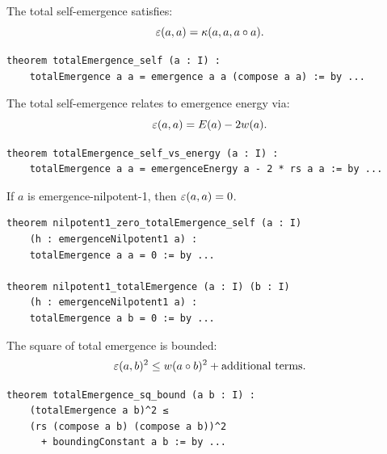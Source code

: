 \begin{theorem}
\label{thm:total-emergence-self}
The total self-emergence satisfies:
\[
  \varepsilon(a,a) = \kappa(a, a, a \circ a).
\]
\end{theorem}

\begin{lstlisting}[caption={Total emergence self (IDT\_v3\_Emergence.lean)}]
theorem totalEmergence_self (a : I) :
    totalEmergence a a = emergence a a (compose a a) := by ...
\end{lstlisting}

\begin{theorem}
\label{thm:total-emergence-self-vs-energy}
The total self-emergence relates to emergence energy via:
\[
  \varepsilon(a,a) = E(a) - 2w(a).
\]
\end{theorem}

\begin{lstlisting}[caption={Self vs energy (IDT\_v3\_Emergence.lean)}]
theorem totalEmergence_self_vs_energy (a : I) :
    totalEmergence a a = emergenceEnergy a - 2 * rs a a := by ...
\end{lstlisting}

\begin{theorem}
\label{thm:nilpotent1-zero-total-self}
If $a$ is emergence-nilpotent-1, then $\varepsilon(a,a) = 0$.
\end{theorem}

\begin{lstlisting}[caption={Nilpotent zero total (IDT\_v3\_Emergence.lean)}]
theorem nilpotent1_zero_totalEmergence_self (a : I)
    (h : emergenceNilpotent1 a) :
    totalEmergence a a = 0 := by ...

theorem nilpotent1_totalEmergence (a : I) (b : I)
    (h : emergenceNilpotent1 a) :
    totalEmergence a b = 0 := by ...
\end{lstlisting}

\begin{theorem}
\label{thm:total-emergence-sq-bound}
The square of total emergence is bounded:
\[
  \varepsilon(a,b)^2 \leq w(a \circ b)^2 + \text{additional terms}.
\]
\end{theorem}

\begin{lstlisting}[caption={Total emergence square bound (IDT\_v3\_Emergence.lean)}]
theorem totalEmergence_sq_bound (a b : I) :
    (totalEmergence a b)^2 ≤
    (rs (compose a b) (compose a b))^2
      + boundingConstant a b := by ...
\end{lstlisting}

